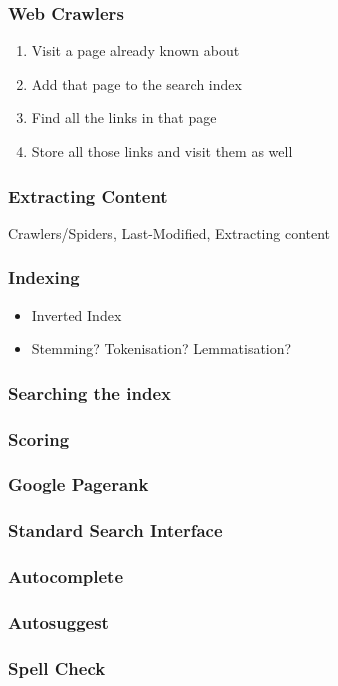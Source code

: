 \documentclass{beamer}
\begin{document}
\begin{frame}
  \frametitle{Web Crawlers}
  \begin{enumerate}
    \item Visit a page already known about
    \item Add that page to the search index
    \item Find all the links in that page
    \item Store all those links and visit them as well
  \end{enumerate}
\end{frame}

\begin{frame}
  \frametitle{Extracting Content}
  Crawlers/Spiders, Last-Modified, Extracting content
\end{frame}

\begin{frame}
  \frametitle{Indexing}
  \begin{itemize}
  \item Inverted Index
  \item Stemming? Tokenisation? Lemmatisation?
  \end{itemize}
\end{frame}

\begin{frame}
  \frametitle{Searching the index}
\end{frame}


\begin{frame}
  \frametitle{Scoring}
\end{frame}

\begin{frame}
  \frametitle{Google Pagerank}
\end{frame}

\begin{frame}
  \frametitle{Standard Search Interface}
\end{frame}

\begin{frame}
  \frametitle{Autocomplete}
\end{frame}

\begin{frame}
  \frametitle{Autosuggest}
\end{frame}

\begin{frame}
  \frametitle{Spell Check}
\end{frame}
\end{document}
